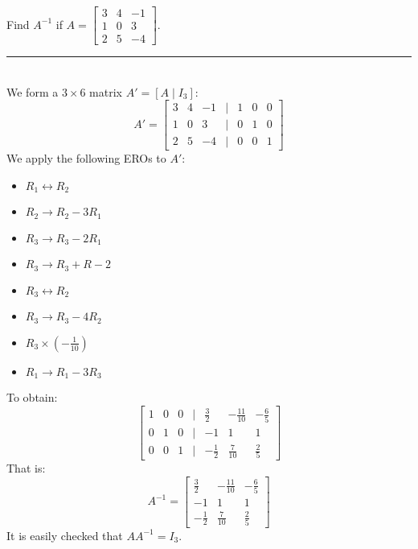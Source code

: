 \documentclass[a4paper, 9pt]{extarticle}
\begin{document}
\begin{examplebox}{}{}
  Find $A^{-1}$ if $A = \begin{bmatrix}
      3 & 4 & -1 \\
      1 & 0 & 3  \\
      2 & 5 & -4
    \end{bmatrix}$.
  \\[2ex] \rule{\textwidth}{1px} \\
  We form a $3 \times 6$ matrix $A' = [A \mid I_3]$:
  $$
    A' = \begin{bmatrix}
      3 & 4 & -1 & | & 1 & 0 & 0 \\
      1 & 0 & 3  & | & 0 & 1 & 0 \\
      2 & 5 & -4 & | & 0 & 0 & 1
    \end{bmatrix}
  $$
  We apply the following EROs to $A'$:
  \begin{itemize}
    \item $R_1 \leftrightarrow R_2$
    \item $R_2 \rightarrow R_2 - 3R_1$
    \item $R_3 \rightarrow R_3 - 2R_1$
    \item $R_3 \rightarrow R_3 + R-2$
    \item $R_3 \leftrightarrow R_2$
    \item $R_3 \rightarrow R_3 - 4R_2$
    \item $R_3 \times (-\frac{1}{10})$
    \item $R_1 \rightarrow R_1 - 3R_3$
  \end{itemize}
  To obtain:
  $$
    \begin{bmatrix}
      1 & 0 & 0 & | & \frac{3}{2}  & -\frac{11}{10} & -\frac{6}{5} \\
      0 & 1 & 0 & | & -1           & 1              & 1            \\
      0 & 0 & 1 & | & -\frac{1}{2} & \frac{7}{10}   & \frac{2}{5}
    \end{bmatrix}
  $$
  That is:
  $$A^{-1} = \begin{bmatrix}
      \frac{3}{2}  & -\frac{11}{10} & -\frac{6}{5} \\
      -1           & 1              & 1            \\
      -\frac{1}{2} & \frac{7}{10}   & \frac{2}{5}
    \end{bmatrix}$$
  It is easily checked that $AA^{-1} = I_3$.
\end{examplebox}
\pagebreak
\end{document}
